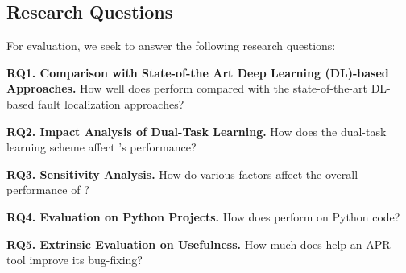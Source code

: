 \subsection{Research Questions}

For evaluation, we seek to answer the following research questions:

\vspace{2pt}
\noindent\textbf{RQ1. Comparison with State-of-the Art Deep Learning
  (DL)-based Approaches.}  How well does {\tool} perform compared with
the state-of-the-art DL-based fault localization approaches?

\vspace{2pt}
\noindent\textbf{RQ2. Impact Analysis of Dual-Task Learning.} 
How does the dual-task learning scheme affect {\tool}'s performance?

\vspace{2pt}
\noindent\textbf{RQ3. Sensitivity Analysis.} How do various factors affect the overall performance of {\tool}?

\vspace{2pt}
\noindent\textbf{RQ4. Evaluation on Python Projects.} How does {\tool}
perform on Python code?

\vspace{2pt}
\noindent\textbf{RQ5. Extrinsic Evaluation on Usefulness.} How much
does {\tool} help an APR tool improve its bug-fixing?
